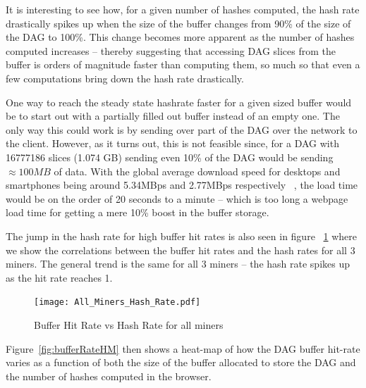 \documentclass[runningheads]{llncs}
\begin{document}

It is interesting to see how, for a given number of hashes computed, the hash rate drastically spikes up when the size of the buffer changes from 90\% of the size of the DAG to 100\%. This change becomes more apparent as the number of hashes computed increases -- thereby suggesting that accessing DAG slices from the buffer is orders of magnitude faster than computing them, so much so that even a few computations bring down the hash rate drastically. 

One way to reach the steady state hashrate faster for a given sized buffer would be to start out with a partially filled out buffer instead of an empty one. The only way this could work is by sending over part of the DAG over the network to the client. However, as it turns out, this is not feasible since, for a DAG with 16777186 slices (1.074 GB) sending even 10\% of the DAG would be sending $\approx100MB$ of data. With the global average download speed for desktops and smartphones being around 5.34MBps and 2.77MBps respectively ~\cite{internetSpeed}, the load time would be on the order of 20 seconds to a minute -- which is too long a webpage load time for getting a mere 10\% boost in the buffer storage. 

The jump in the hash rate for high buffer hit rates is also seen in figure ~\ref{fig:bufferRatevsHashRate} where we show the correlations between the buffer hit rates and the hash rates for all 3 miners. The general trend is the same for all 3 miners -- the hash rate spikes up as the hit rate reaches 1.

\begin{figure}[h]
\centering
\texttt{[image: All\_Miners\_Hash\_Rate.pdf]}
\caption{\label{fig:bufferRatevsHashRate} Buffer Hit Rate vs Hash Rate for all miners}
\end{figure}

Figure~\ref{fig:bufferRateHM} then shows a heat-map of how the DAG buffer hit-rate varies as a function of both the size of the buffer allocated to store the DAG and the number of hashes computed in the browser. 
\end{document}
